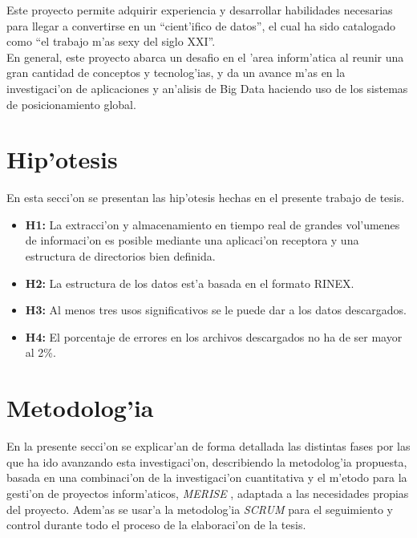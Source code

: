 Este proyecto permite adquirir experiencia y desarrollar habilidades necesarias para llegar a convertirse en un ``cient'ifico de datos'', el cual ha sido catalogado como ``el trabajo m'as sexy del siglo XXI''\cite{ThomasH.Davenport2012}.\\

En general, este proyecto abarca un desafio en el 'area inform'atica al reunir una gran cantidad de conceptos y tecnolog'ias, y da un avance m'as en la investigaci'on de aplicaciones y an'alisis de Big Data haciendo uso de los sistemas de posicionamiento global.

\section{Hip'otesis}
\noindent
En esta secci'on se presentan las hip'otesis hechas en el presente trabajo de tesis.

\begin{itemize}
\item \textbf{H1:} La extracci'on y almacenamiento en tiempo real de grandes vol'umenes de informaci'on es posible mediante una aplicaci'on receptora y una estructura de directorios bien definida.

\item \textbf{H2:} La estructura de los datos est'a basada en el formato RINEX.

\item \textbf{H3:} Al menos tres usos significativos se le puede dar a los datos descargados.

\item \textbf{H4:} El porcentaje de errores en los archivos descargados no ha de ser mayor al 2\%.

\end{itemize}
\section{Metodolog'ia}
\noindent
En la presente secci'on se explicar'an de forma detallada las distintas fases por las que ha ido avanzando esta investigaci'on, describiendo la metodolog'ia propuesta, basada en una combinaci'on de la investigaci'on cuantitativa  y el m'etodo para la gesti'on de proyectos inform'aticos, \emph{MERISE} \cite{Avison1991}, adaptada a las necesidades propias del proyecto. Adem'as se usar'a la metodolog'ia \emph{SCRUM} para el seguimiento y control durante todo el proceso de la elaboraci'on de la tesis.\\


